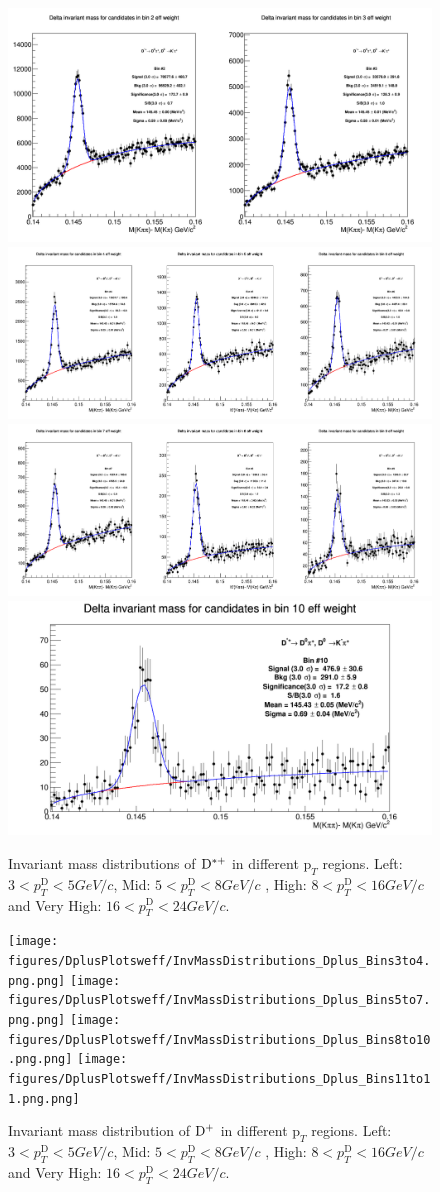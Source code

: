 \begin{enumerate}
\begin{figure}[h]

{\includegraphics[width=.32\linewidth]{figures/Dstar_wEFF/InvMassDistributions_Dstar_Bins2to3.png}}
{\includegraphics[width=.32\linewidth]{figures/Dstar_wEFF/InvMassDistributions_Dstar_Bins4to6.png}}
{\includegraphics[width=.32\linewidth]{figures/Dstar_wEFF/InvMassDistributions_Dstar_Bins7to9.png}}
{\includegraphics[width=.32\linewidth]{figures/Dstar_wEFF/InvMassDistributions_Dstar_Bins10to10.png}}

\caption{Invariant mass distributions of ${\rm D^{*+}}$ in different $\text{p}_T$ regions. Left: $3< p_{T}^{\text{D}}< 5 GeV/c$, Mid: $5< p_{T}^{\text{D}}< 8 GeV/c$ , High: $8< p_{T}^{\text{D}}< 16 GeV/c$ and Very High: $16<p_{T}^{\text{D}}< 24 GeV/c$.}
\label{fig:InvMass}
\end{figure}




\begin{figure}[h]

{\texttt{[image: figures/DplusPlotsweff/InvMassDistributions\_Dplus\_Bins3to4.png.png]}}
{\texttt{[image: figures/DplusPlotsweff/InvMassDistributions\_Dplus\_Bins5to7.png.png]}}
{\texttt{[image: figures/DplusPlotsweff/InvMassDistributions\_Dplus\_Bins8to10.png.png]}}
{\texttt{[image: figures/DplusPlotsweff/InvMassDistributions\_Dplus\_Bins11to11.png.png]}}

\caption{Invariant mass distribution of ${\rm D^+}$ in different $\text{p}_T$ regions. Left: $3< p_{T}^{\text{D}}< 5 GeV/c$, Mid: $5< p_{T}^{\text{D}}< 8 GeV/c$ , High: $8< p_{T}^{\text{D}}< 16 GeV/c$ and Very High: $16<p_{T}^{\text{D}}< 24 GeV/c$.}
\label{fig:InvMass}
\end{figure}


\end{enumerate}

